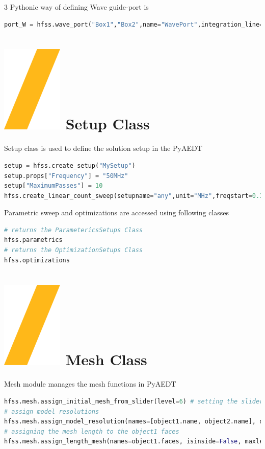\documentclass[9pt,landscape]{article}
\begin{document}
\begin{multicols}{3}
Pythonic way of defining Wave guide-port is
\begin{lstlisting}[language=Python]
port_W = hfss.wave_port("Box1","Box2",name="WavePort",integration_line=1)
\end{lstlisting}

\section{\includegraphics[height=\fontcharht\font`\S]{slash.png} Setup Class}
Setup class is used to define the solution setup in the PyAEDT

\begin{lstlisting}[language=Python]
setup = hfss.create_setup("MySetup")
setup.props["Frequency"] = "50MHz"
setup["MaximumPasses"] = 10
hfss.create_linear_count_sweep(setupname="any",unit="MHz",freqstart=0.1,freqstop=100,num_of_freq_points=100, sweepname="sweep1",sweep_type="Interpolating", save_fields=False)
\end{lstlisting}

Parametric sweep and optimizations are accessed using following classes

\begin{lstlisting}[language=Python]
# returns the ParametericsSetups Class
hfss.parametrics
# returns the OptimizationSetups Class
hfss.optimizations
\end{lstlisting}
\columnbreak
\section{\includegraphics[height=\fontcharht\font`\S]{slash.png} Mesh Class}
Mesh module manages the mesh functions in PyAEDT
\begin{lstlisting}[language=Python]
hfss.mesh.assign_initial_mesh_from_slider(level=6) # setting the slider level to 6
# assign model resolutions
hfss.mesh.assign_model_resolution(names=[object1.name, object2.name], defeature_length=None)
# assigning the mesh length to the object1 faces
hfss.mesh.assign_length_mesh(names=object1.faces, isinside=False, maxlength=1, maxel=2000)
\end{lstlisting}


\end{multicols}
\end{document}
